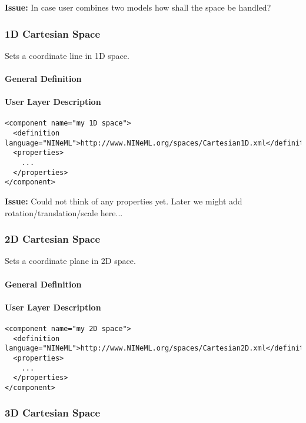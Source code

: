 \documentclass{article}
\newcommand{\issue}[1]{%
\begin{center}
\colorbox{issuecolor}{\parbox{0.8\linewidth}{\textbf{Issue:} #1}}
\end{center}%
}
\begin{document}
\issue{In case user combines two models how shall the space be handled?}

\subsubsection{1D Cartesian Space}

Sets a coordinate line in 1D space.

\paragraph{General Definition}

\paragraph{User Layer Description}
\begin{verbatim}
<component name="my 1D space">
  <definition language="NINeML">http://www.NINeML.org/spaces/Cartesian1D.xml</definition>
  <properties>
    ...
  </properties>
</component>
\end{verbatim}

\issue{Could not think of any properties yet. Later we might add
rotation/translation/scale here...}

\subsubsection{2D Cartesian Space}

Sets a coordinate plane in 2D space.

\paragraph{General Definition}

\paragraph{User Layer Description}
\begin{verbatim}
<component name="my 2D space">
  <definition language="NINeML">http://www.NINeML.org/spaces/Cartesian2D.xml</definition>
  <properties>
    ...
  </properties>
</component>
\end{verbatim}

\subsubsection{3D Cartesian Space}
\end{document}
